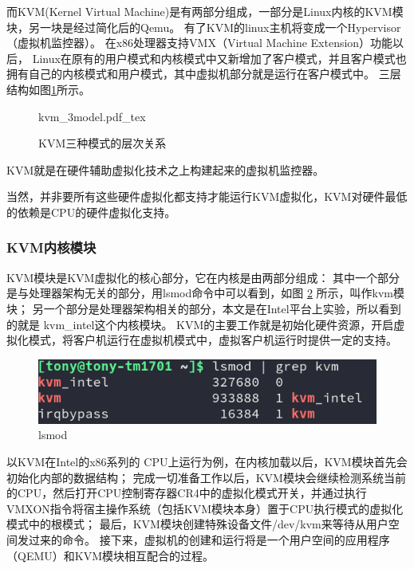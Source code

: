 而KVM(Kernel Virtual Machine)是有两部分组成，一部分是Linux内核的KVM模块，另一块是经过简化后的Qemu。
有了KVM的linux主机将变成一个Hypervisor（虚拟机监控器）。
在x86处理器支持VMX（Virtual Machine Extension）功能以后，
Linux在原有的用户模式和内核模式中又新增加了客户模式，并且客户模式也拥有自己的内核模式和用户模式，其中虚拟机部分就是运行在客户模式中。
三层结构如图\ref{fig:kvm}所示。

\begin{figure}[htbp]
    \centering
    \def\svgscale{0.5}
    {kvm_3model.pdf_tex}
    \caption{KVM三种模式的层次关系}
    \label{fig:kvm}
\end{figure}    

KVM就是在硬件辅助虚拟化技术之上构建起来的虚拟机监控器。

当然，并非要所有这些硬件虚拟化都支持才能运行KVM虚拟化，KVM对硬件最低的依赖是CPU的硬件虚拟化支持。

\subsubsection{KVM内核模块}
KVM模块是KVM虚拟化的核心部分，它在内核是由两部分组成：
其中一个部分是与处理器架构无关的部分，用lsmod命令中可以看到，如图 \ref{fig:lsmod_kvm} 所示，叫作kvm模块；
另一个部分是处理器架构相关的部分，本文是在Intel平台上实验，所以看到的就是 kvm\_intel这个内核模块。
KVM的主要工作就是初始化硬件资源，开启虚拟化模式，将客户机运行在虚拟机模式中，虚拟客户机运行时提供一定的支持。

\begin{figure}[htbp]
  \centering %
  \includegraphics[width=0.9 \textwidth]{figs/RISC-V/KVM/lsmod_kvm.png}
  \caption{lsmod}
  \label{fig:lsmod_kvm} %
\end{figure}

以KVM在Intel的x86系列的 CPU上运行为例，在内核加载以后，KVM模块首先会初始化内部的数据结构；
完成一切准备工作以后，KVM模块会继续检测系统当前的CPU，然后打开CPU控制寄存器CR4中的虚拟化模式开关，并通过执行VMXON指令将宿主操作系统（包括KVM模块本身）置于CPU执行模式的虚拟化模式中的根模式；
最后，KVM模块创建特殊设备文件/dev/kvm来等待从用户空间发过来的命令。
接下来，虚拟机的创建和运行将是一个用户空间的应用程序（QEMU）和KVM模块相互配合的过程。

